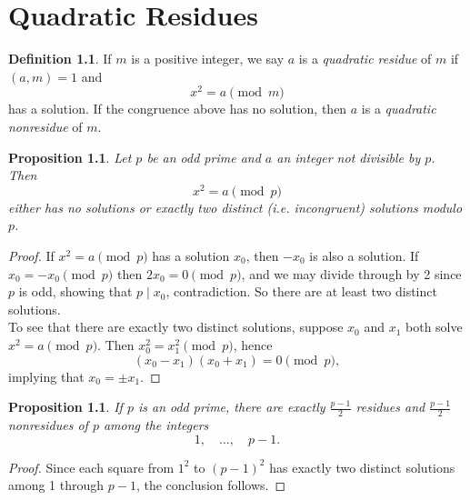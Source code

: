 \documentclass{amsbook}
\numberwithin{section}{chapter}
\theoremstyle{plain}
\newtheorem{prop}[thm]{Proposition}
\theoremstyle{definition}
\newtheorem{defn}[thm]{Definition}
\def\br{~\\[1em]}
\begin{document}
\chapter{Quadratic Residues}
\begin{defn}
If $m$ is a positive integer, we say $a$ is a \textit{quadratic residue}
of $m$ if $(a, m) = 1$ and
\[x^2 = a\pmod m\]
has a solution. If the congruence above has no solution, then
$a$ is a \textit{quadratic nonresidue} of $m$.
\end{defn}
\begin{prop}
Let $p$ be an odd prime and $a$ an integer not divisible by $p$.
Then
\[x^2 = a\pmod p\]
either has no solutions or exactly two distinct (i.e. incongruent)
solutions modulo $p$.
\end{prop}
\begin{proof}
If $x^2 = a \pmod p$ has a solution $x_0$, then $-x_0$ is also a
solution. If $x_0 = -x_0\pmod p$ then $2x_0 = 0\pmod p$, and we may 
divide through by 2 since $p$ is odd, showing that $p\mid x_0$,
contradiction. So there are at least two distinct solutions.
\br
To see that there are exactly two distinct solutions,
suppose $x_0$ and $x_1$ both solve
$x^2 = a\pmod p$. Then $x_0^2 = x_1^2\pmod p$, hence
\[(x_0 - x_1)(x_0 + x_1) = 0\pmod p,\]
implying that $x_0 =\pm x_1$.
\end{proof}
\begin{prop}
If $p$ is an odd prime, there are exactly $\frac{p-1}{2}$ residues
and $\frac{p-1}{2}$ nonresidues of $p$ among the integers
\[1,\quad\dots,\quad p-1.\]
\end{prop}
\begin{proof}
Since each square from $1^2$ to $(p-1)^2$ has exactly
two distinct solutions among 1 through $p-1$,
the conclusion follows.
\end{proof}
\end{document}
